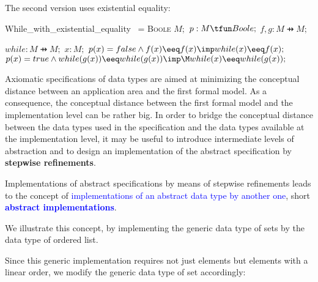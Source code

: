 \documentclass[landscape, autoslides, light]{mmiss}
\begin{document}
\begin{Package}[Label={FSDPT}, Title={Formal Specification of Data and Process Types}, ShortTitle={FSDPT}, Authors={Horst Reichel}, Date={February 2003}, LevelOfDetail=Lecture, Language=en-GB]
\begin{Section}[Title={Initial Algebras as Data Types}, Label={section3}]
\begin{Section}[Title={Partial Constructors}, Label={section3_5}]
\begin{Paragraph}[Label=Paragraph79]
\end{Paragraph}
\begin{Paragraph}[Label=Paragraph80]
The second version uses existential equality:

\begin{SpecDefn}{While\_with\_existential\_equality} ~= \textsc{Boole}
\I \Then
 \I\Sort \(M; \)
 \I\Op \( p : M \tfun Boole ;\)
 \I\Ops \( f,g : M \pfun M;\) \I \Then
 \I{\Free~\Group} \begin{Items}
 \I\Op \( while : M \pfun M; \)
 \I\Var \( x : M; \)
 \I\Axioms \(  p(x) = false \wedge f(x) \eeq f(x)
 \imp while(x ) \eeq f(x); \)
 \\ \(p(x) = true \wedge while(g(x)) \eeq while(g(x))
 \imp \\\M while(x) \eeq while(g(x));\) \EndGroup
 \end{Items}
 \I\End
 \end{SpecDefn}

\end{Paragraph}
\end{Section}
\begin{Section}[Title={Data Refinement}, Label={section3_6}]
\begin{Paragraph}
\small
 Axiomatic specifications of data types are aimed at minimizing
the conceptual distance between an application area and the first
formal model. As a consequence, the conceptual distance between
the first formal model and the implementation level can be rather
big. In order to bridge the conceptual distance between the data
types used in the specification and the data types available at
the implementation level, it may be useful to introduce
intermediate levels of abstraction and to design an implementation
of the abstract specification by \textbf{stepwise refinements}.


\end{Paragraph}
\begin{Paragraph}[Label=Paragraph81]

Implementations of abstract specifications by means of stepwise
refinements leads to  the concept of
\textcolor{blue}{implementations of an abstract data type by
another one}, short \textcolor{blue}{\textbf{abstract
implementations}}.\pause \vspace{8mm}

We illustrate this concept, by implementing the generic data type
of sets by the data type of ordered list.\pause \vspace{8mm}

Since this generic implementation requires not just elements but
elements with a linear order, we modify the generic data type of
set accordingly:


\end{Paragraph}
\end{Section}
\end{Section}
\end{Package}
\end{document}
